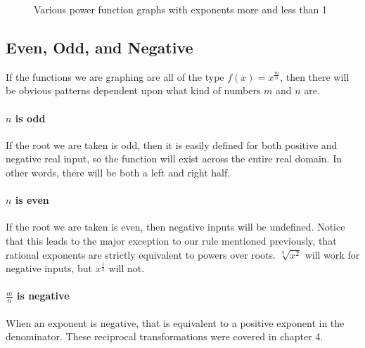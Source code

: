 \begin{figure}
\begin{centering}
\caption{Various power function graphs with exponents more and less than 1}
\end{centering}
\end{figure}

\subsection{Even, Odd, and Negative}
If the functions we are graphing are all of the type $f(x)=x^\frac{m}{n}$, then there will be
obvious patterns dependent upon what kind of numbers $m$ and $n$ are.  

\paragraph{$n$ is odd}
If the root we are taken is odd, then it is easily defined for both positive and negative real input,
so the function will exist across the entire real domain.  In other words, there will be both a
left and right half.

\paragraph{$n$ is even}
If the root we are taken is even, then negative inputs will be undefined.  Notice that this leads to
the major exception to our rule mentioned previously, that rational exponents are strictly equivalent
to powers over roots.  $\sqrt[4]{x^2}$ will work for negative inputs, but $x^\frac{1}{2}$ will not.

\paragraph{$\frac{m}{n}$ is negative}
When an exponent is negative, that is equivalent to a positive exponent in the denominator.
These reciprocal transformations were covered in chapter 4.
